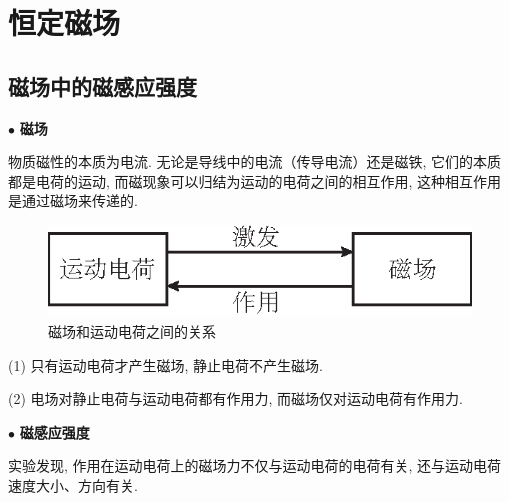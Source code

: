 \chapter{恒定磁场}

\begin{introduction}
	
	\item {}
	
	\item {}
	
	\item {}
	
	\item {}
	
	\item {}
	
	\item {}
	
\end{introduction}

\section{磁场中的磁感应强度}\label{8.1}

$\bullet$ \textbf{磁场}

物质磁性的本质为电流. 无论是导线中的电流（传导电流）还是磁铁, 它们的本质都是电荷的运动, 而磁现象可以归结为运动的电荷之间的相互作用, 这种相互作用是通过磁场来传递的. 

\begin{figure}[H]
	\centering
	\includegraphics[scale=1.0]{C8-fig1.eps}
	\caption{磁场和运动电荷之间的关系}
\end{figure}

\begin{note}
	
	(1) 只有运动电荷才产生磁场, 静止电荷不产生磁场. 
	
	(2) 电场对静止电荷与运动电荷都有作用力, 而磁场仅对运动电荷有作用力. 
	
\end{note}


$\bullet$ \textbf{磁感应强度}

实验发现, 作用在运动电荷上的磁场力不仅与运动电荷的电荷有关, 还与运动电荷速度大小、方向有关. 

